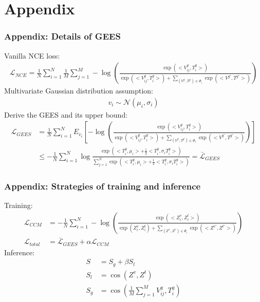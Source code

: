 \documentclass[notes, 10pt, aspectratio=169]{beamer}
\begin{document}
\section*{Appendix}
\begin{frame}
    \frametitle{Appendix: Details of GEES}
    Vanilla NCE loss:
    \begin{align*}
        \mathcal{L}_{NCE} = \frac{1}{N}\sum_{i = 1}^N \frac{1}{M}\sum_{j = 1}^M -\log \left( \frac{\exp \left( <V_{ij}^g, T_i^g> \right) }{\exp\left( <V_{ij}^g, T_i^g> \right) + \sum_{(V^{g'}, T^{g'})\in \Phi_i}\exp\left( <V^{g'}, T^{g'}> \right) } \right) 
    \end{align*}
    Multivariate Gaussian distribution assumption:
    \begin{align*}
        v_i\sim \mathcal{N}\left( \mu_i, \sigma_i \right) 
    \end{align*}
    Derive the GEES and its upper bound:
    \begin{align*}
        \mathcal{L}_{GEES} &= \frac{1}{N}\sum_{i = 1}^N E_{v_i} \left[ -\log \left(  \frac{\exp \left( <V_{ij}^g, T_i^g> \right) }{\exp\left( <V_{ij}^g, T_i^g> \right) + \sum_{(V^{g'}, T^{g'})\in \Phi_i}\exp\left( <V^{g'}, T^{g'}> \right) }  \right)  \right] \\
                           &\leq -\frac{1}{N}\sum_{i = 1}^N\log \frac{\exp\left( <T_i^g, \mu_i> + \frac{1}{2}<T_i^g, \sigma_iT_i^g> \right) }{\sum_{j=1}^N\exp\left( <T_i^g, \mu_i> + \frac{1}{2}<T_i^g, \sigma_iT_i^g> \right) } = \bar{\mathcal{L}}_{GEES}
    \end{align*}
\end{frame}

\begin{frame}
    \frametitle{Appendix: Strategies of training and inference}
    Training:
    \begin{align*}
    \mathcal{L}_{CCM}&= -\frac{1}{N}\sum_{i = 1}^N-\log \left( \frac{\exp\left( <Z_i^v, Z_i^t> \right) }{\exp\left( Z_i^v, Z_i^t \right)+\sum_{(Z^{v'}, Z^{t'})\in \Psi_i}\exp\left( <Z^{v'}, Z^{t'}> \right)  } \right) \\
    \mathcal{L}_{total} &= \bar{\mathcal{L}}_{GEES} + \alpha \mathcal{L}_{CCM}
    \end{align*}
    Inference:
    \begin{align*}
        S &= S_g + \beta S_l\\
        S_l &= \cos\left( Z^v, Z^t \right) \\
        S_g &= \cos\left( \frac{1}{M}\sum_{j = 1}^M V_{ij}^g, T_i^g \right) 
    \end{align*}
\end{frame}
\end{document}
